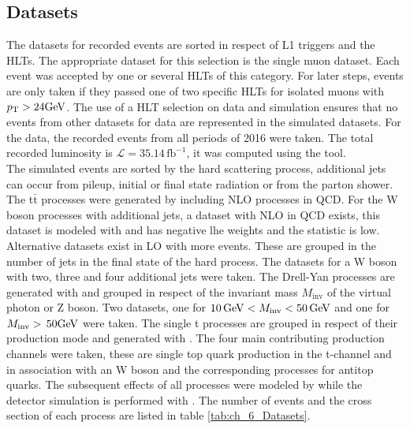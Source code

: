 \subsection{Datasets}
The datasets for recorded events are sorted in respect of L1 triggers and the HLTs. The appropriate dataset for this selection is the single muon dataset. Each event was accepted by one or several HLTs of this category. For later steps, events are only taken if they passed one of two specific HLTs for isolated muons with $p_\mathrm{T} > 24\mathrm{GeV}$. The use of a HLT selection on data and simulation ensures that no events from other datasets for data are represented in the simulated datasets. For the data, the recorded events from all periods of 2016 were taken. The total recorded luminosity is $\mathcal{L} = 35.14\,\textrm{fb}^{-1}$, it was computed using the \brilcalc \cite{brilcalc} tool.\\

The simulated events are sorted by the hard scattering process, additional jets can occur from pileup, initial or final state radiation or from the parton shower. The t$\bar{\textrm{t}}$ processes were generated by \powheg including NLO processes in QCD. For the W boson processes with additional jets, a dataset with NLO in QCD exists, this dataset is modeled with \amcatnlo and has negative lhe weights and the statistic is low. Alternative datasets exist in LO with more events. These are grouped in the number of jets in the final state of the hard process. The datasets for a W boson with two, three and four additional jets were taken. The Drell-Yan processes are generated with \amcatnlo and grouped in respect of the invariant mass $M_\textrm{inv}$ of the virtual photon or Z boson. Two datasets, one for $10\,\mathrm{GeV} < M_\textrm{inv} < 50\,\mathrm{GeV}$ and one for $M_\textrm{inv}>\,50\mathrm{GeV}$ were taken. The single t processes are grouped in respect of their production mode and generated with {\powheg}. The four main contributing production channels were taken, these are single top quark production in the t-channel and in association with an W boson and the corresponding processes for antitop quarks. The subsequent effects of all processes were modeled by  while the detector simulation is performed with {\geant}. The number of events and the cross section of each process are listed in table \ref{tab:ch_6_Datasets}.

